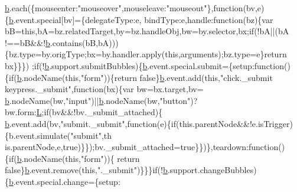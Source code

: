 \begin{DoxyCode}
      \hyperlink{a00039_aa4026ad5544b958e54ce5e106fa1c805}{b}.each(\{mouseenter:\textcolor{stringliteral}{"mouseover"},mouseleave:\textcolor{stringliteral}{"mouseout"}\},\textcolor{keyword}{function}(bv,e)\{\hyperlink{a00039_aa4026ad5544b958e54ce5e106fa1c805}{b}.event.special[bv]=\{delegateType:e,
      bindType:e,handle:\textcolor{keyword}{function}(bz)\{var bB=\textcolor{keyword}{this},bA=bz.relatedTarget,by=bz.handleObj,bw=by.selector,bx;\textcolor{keywordflow}{if}(!bA||(bA
      !==bB&&!\hyperlink{a00039_aa4026ad5544b958e54ce5e106fa1c805}{b}.contains(bB,bA)))\{bz.type=by.origType;bx=by.handler.apply(\textcolor{keyword}{this},arguments);bz.type=e\}\textcolor{keywordflow}{return} bx\}\}\})
      ;\textcolor{keywordflow}{if}(!\hyperlink{a00039_aa4026ad5544b958e54ce5e106fa1c805}{b}.support.submitBubbles)\{\hyperlink{a00039_aa4026ad5544b958e54ce5e106fa1c805}{b}.event.special.submit=\{setup:\textcolor{keyword}{function}()\{\textcolor{keywordflow}{if}(\hyperlink{a00039_aa4026ad5544b958e54ce5e106fa1c805}{b}.nodeName(\textcolor{keyword}{this},\textcolor{stringliteral}{"form"}))\{\textcolor{keywordflow}{return}
       \textcolor{keyword}{false}\}\hyperlink{a00039_aa4026ad5544b958e54ce5e106fa1c805}{b}.event.add(\textcolor{keyword}{this},\textcolor{stringliteral}{"click.\_submit keypress.\_submit"},\textcolor{keyword}{function}(bx)\{var bw=bx.target,bv=
      \hyperlink{a00039_aa4026ad5544b958e54ce5e106fa1c805}{b}.nodeName(bw,\textcolor{stringliteral}{"input"})||\hyperlink{a00039_aa4026ad5544b958e54ce5e106fa1c805}{b}.nodeName(bw,\textcolor{stringliteral}{"button"})?bw.form:\hyperlink{a00039_a38ee4c0b5f4fe2a18d0c783af540d253}{L};\textcolor{keywordflow}{if}(bv&&!bv.\_submit\_attached)\{
      \hyperlink{a00039_aa4026ad5544b958e54ce5e106fa1c805}{b}.event.add(bv,\textcolor{stringliteral}{"submit.\_submit"},\textcolor{keyword}{function}(e)\{\textcolor{keywordflow}{if}(this.parentNode&&!e.isTrigger)\{b.event.simulate(\textcolor{stringliteral}{"submit"},th
      is.parentNode,e,true)\}\});bv.\_submit\_attached=\textcolor{keyword}{true}\}\})\},teardown:\textcolor{keyword}{function}()\{\textcolor{keywordflow}{if}(\hyperlink{a00039_aa4026ad5544b958e54ce5e106fa1c805}{b}.nodeName(\textcolor{keyword}{this},\textcolor{stringliteral}{"form"}))\{\textcolor{keywordflow}{
      return} \textcolor{keyword}{false}\}\hyperlink{a00039_aa4026ad5544b958e54ce5e106fa1c805}{b}.event.remove(\textcolor{keyword}{this},\textcolor{stringliteral}{".\_submit"})\}\}\}\textcolor{keywordflow}{if}(!\hyperlink{a00039_aa4026ad5544b958e54ce5e106fa1c805}{b}.support.changeBubbles)\{\hyperlink{a00039_aa4026ad5544b958e54ce5e106fa1c805}{b}.event.special.change=\{setup:\textcolor{keyword}{
}
\end{DoxyCode}
